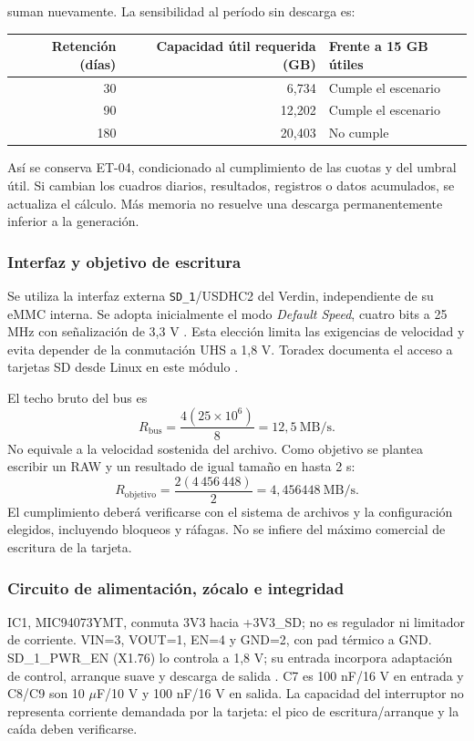 \documentclass[11pt,letterpaper]{article}
\begin{document}
suman nuevamente. La sensibilidad al período sin descarga es:
\begin{center}
\begin{tabular}{rrl}
\toprule
Retención (días) & Capacidad útil requerida (GB) & Frente a 15 GB útiles \\
\midrule
30 & 6,734 & Cumple el escenario \\
90 & 12,202 & Cumple el escenario \\
180 & 20,403 & No cumple \\
\bottomrule
\end{tabular}
\end{center}
Así se conserva ET-04, condicionado al cumplimiento de las cuotas y
del umbral útil. Si cambian los cuadros diarios, resultados, registros
o datos acumulados, se actualiza el cálculo. Más memoria no resuelve
una descarga permanentemente inferior a la generación.

\subsubsection{Interfaz y objetivo de escritura}
Se utiliza la interfaz externa \texttt{SD\_1}/USDHC2 del Verdin,
independiente de su eMMC interna. Se adopta inicialmente el modo
\emph{Default Speed}, cuatro bits a 25 MHz con señalización de 3,3 V
\cite{verdinds}. Esta elección limita las exigencias de velocidad y
evita depender de la conmutación UHS a 1,8 V. Toradex documenta el
acceso a tarjetas SD desde Linux en este módulo \cite{toradexsd}.

El techo bruto del bus es
\begin{equation}
R_{\mathrm{bus}}=\frac{4(25\times10^6)}{8}
=12{,}5\ \mathrm{MB/s}.
\end{equation}
No equivale a la velocidad sostenida del archivo. Como objetivo se
plantea escribir un RAW y un resultado de igual tamaño en hasta 2 s:
\begin{equation}
R_{\mathrm{objetivo}}=\frac{2(4\,456\,448)}{2}
=4{,}456448\ \mathrm{MB/s}.
\end{equation}
El cumplimiento deberá verificarse con el sistema de archivos y la
configuración elegidos, incluyendo bloqueos y ráfagas. No se infiere
del máximo comercial de escritura de la tarjeta.


\subsubsection{Circuito de alimentación, zócalo e integridad}
IC1, MIC94073YMT, conmuta 3V3 hacia +3V3\_SD; no es regulador ni limitador de corriente. VIN=3, VOUT=1, EN=4 y GND=2, con pad térmico a GND. SD\_1\_PWR\_EN (X1.76) lo controla a 1,8 V; su entrada incorpora adaptación de control, arranque suave y descarga de salida \cite{mic94073}. C7 es 100 nF/16 V en entrada y C8/C9 son 10 $\mu$F/10 V y 100 nF/16 V en salida. La capacidad del interruptor no representa corriente demandada por la tarjeta: el pico de escritura/arranque y la caída deben verificarse.
\end{document}
